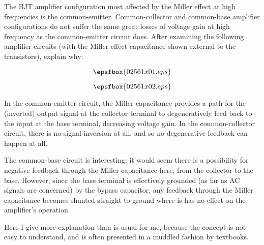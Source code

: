 

The BJT amplifier configuration most affected by the Miller effect at high frequencies is the common-emitter.  Common-collector and common-base amplifier configurations do not suffer the same great losses of voltage gain at high frequency as the common-emitter circuit does.  After examining the following amplifier circuits (with the Miller effect capacitance shown external to the transistors), explain why:

$$\epsfbox{02561x01.eps}$$

$$\epsfbox{02561x02.eps}$$







In the common-emitter circuit, the Miller capacitance provides a path for the (inverted) output signal at the collector terminal to degeneratively feed back to the input at the base terminal, decreasing voltage gain.  In the common-collector circuit, there is no signal inversion at all, and so no degenerative feedback can happen at all.

The common-base circuit is interesting: it would seem there is a possibility for negative feedback through the Miller capacitance here, from the collector to the base.  However, since the base terminal is effectively grounded (as far as AC signals are concerned) by the bypass capacitor, any feedback through the Miller capacitance becomes shunted straight to ground where is has no effect on the amplifier's operation.







Here I give more explanation than is usual for me, because the concept is not easy to understand, and is often presented in a muddled fashion by textbooks.




